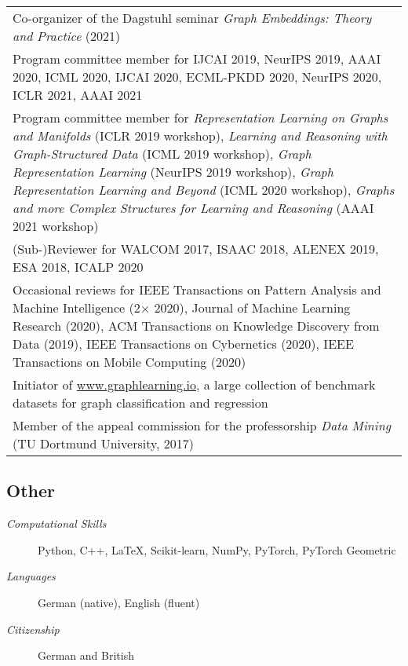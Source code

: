 \documentclass[11pt, a4paper]{scrartcl}
\begin{document}
\begin{tabular}{p{12.0cm}}
Co-organizer of the Dagstuhl seminar \emph{Graph Embeddings: Theory and Practice} (2021)\\[0.5em]
	
Program committee member for IJCAI 2019, NeurIPS  2019, AAAI 2020, ICML 2020, IJCAI 2020, ECML-PKDD 2020,  NeurIPS 2020, ICLR 2021, AAAI 2021\\[0.5em]


Program committee member for \emph{Representation Learning on Graphs and Manifolds} (ICLR 2019 workshop), \emph{Learning and Reasoning with Graph-Structured Data} (ICML 2019 workshop), \emph{Graph Representation Learning} (NeurIPS 2019 workshop), \emph{Graph Representation Learning and Beyond} (ICML 2020 workshop), \emph{Graphs and more Complex Structures for Learning and Reasoning} (AAAI 2021 workshop)\\[0.5em]


(Sub-)Reviewer for WALCOM 2017, ISAAC 2018, ALENEX 2019, ESA 2018, ICALP 2020 \\[0.5em]

Occasional reviews for IEEE Transactions on Pattern Analysis and Machine Intelligence (2$\times$ 2020), Journal of Machine Learning Research (2020), ACM Transactions on Knowledge Discovery from Data (2019), IEEE Transactions on Cybernetics (2020), IEEE Transactions on Mobile Computing (2020)\\[0.5em]

Initiator of \url{www.graphlearning.io}, a large collection of benchmark datasets for graph classification and regression\\[0.5em]

Member of the appeal commission for the professorship \emph{Data Mining} (TU Dortmund University, 2017)
\end{tabular}

\subsection*{Other}

\begin{description}
	\item[\em Computational Skills] Python, C\hspace{-1pt}+\hspace{-1pt}+, \LaTeX, Scikit-learn, NumPy, PyTorch, PyTorch Geometric
	\item[\em Languages] German (native), English (fluent)
	\item[\em Citizenship] German and British
\end{description}
\end{document}
